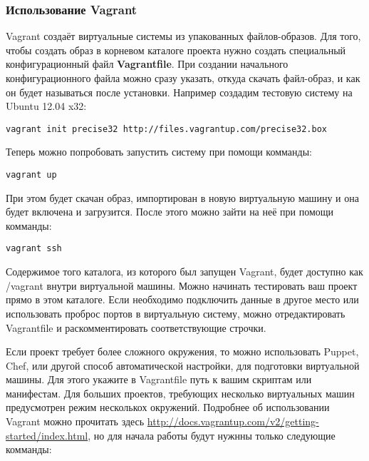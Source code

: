 \subsubsection{Использование Vagrant}

Vagrant создаёт виртуальные системы из упакованных файлов-образов. Для того, чтобы создать образ в корневом каталоге проекта нужно создать специальный конфигурационный файл \textbf{Vagrantfile}. При создании начального конфигурационного файла можно сразу указать, откуда скачать файл-образ, и как он будет называться после установки. Например создадим тестовую систему на Ubuntu 12.04 x32:

\begin{verbatim}
vagrant init precise32 http://files.vagrantup.com/precise32.box
\end{verbatim}

Теперь можно попробовать запустить систему при помощи комманды:

\begin{verbatim}
vagrant up
\end{verbatim}

При этом будет скачан образ, импортирован в новую виртуальную машину и она будет включена и загрузится. После этого можно зайти на неё при помощи комманды:

\begin{verbatim}
vagrant ssh
\end{verbatim}

Содержимое того каталога, из которого был запущен Vagrant, будет доступно как /vagrant внутри виртуальной машины. Можно начинать тестировать ваш проект прямо в этом каталоге. Если необходимо подключить данные в другое место или использовать проброс портов в виртуальную систему, можно отредактировать Vagrantfile и раскомментировать соответствующие строчки.

Если проект требует более сложного окружения, то можно использовать Puppet, Chef, или другой способ автоматической настройки, для подготовки виртуальной машины. Для этого укажите в Vagrantfile путь к вашим скриптам или манифестам. Для больших проектов, требующих несколько виртуальных машин предусмотрен режим несколькох окружений. Подробнее об использовании Vagrant можно прочитать здесь \url{http://docs.vagrantup.com/v2/getting-started/index.html}, но для начала работы будут нужнны только следующие комманды:

